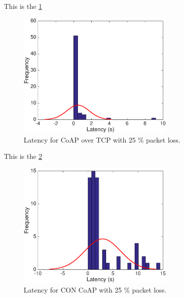 This is the \figurename \ref{coapovertcploss}
\begin{figure}[bh]
	\centering
	\includegraphics[width=3in]{gfx/coapovertcp25loss}
	\caption{Latency for CoAP over TCP with 25 \% packet loss.}
	\label{coapovertcploss}
\end{figure}

This is the \figurename \ref{coapoverudploss}
\begin{figure}[bh]
	\centering
	\includegraphics[width=3in]{gfx/coapoverudp25loss}
	\caption{Latency for CON CoAP with 25 \% packet loss.}
	\label{coapoverudploss}
\end{figure}

